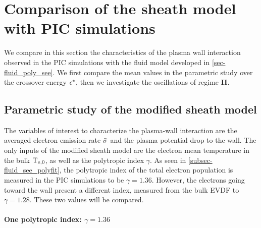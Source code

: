 

\section{Comparison of the sheath model with PIC simulations} \label{subsec-picandmodel}


  We compare in this section the characteristics of the plasma wall interaction observed in the \ac{PIC} simulations with the fluid model developed in \cref{sec-fluid_poly_see}.
  We first compare the mean values in the parametric study over the crossover energy $\epsilon^{*}$, then we investigate the oscillations of regime {\bf II}.

  \subsection{Parametric study of the modified sheath model} \label{subsec-param_sheath_see}

    The variables of interest to characterize the plasma-wall interaction are the averaged electron emission rate $ \bar{\sigma }$ and the plasma potential drop to the wall.
    The only inputs of the modified sheath model are the electron mean temperature in the bulk $\mathrm{T_{e, 0}}$, as well as the polytropic index $\gamma$.
    As seen in \cref{subsec-fluid_see_polyfit}, the polytropic index of the total electron population is measured in the \ac{PIC} simulations to be $\gamma=1.36$.
    However, the electrons going toward the wall present a different index, measured from the bulk \ac{EVDF} to $\gamma=1.28$.
    These two values will be compared.

    \paragraph{One polytropic index: $\gamma=1.36$\\}
    
